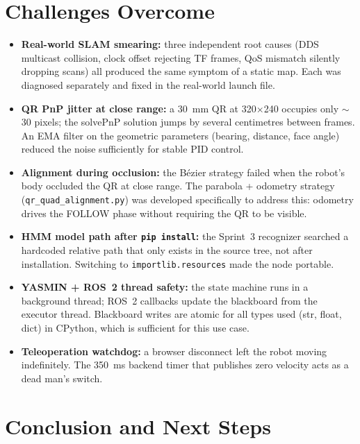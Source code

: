 \documentclass[conference]{IEEEtran}
\begin{document}
\section{Challenges Overcome}

\begin{itemize}[leftmargin=*]
  \item \textbf{Real-world SLAM smearing:} three independent root causes
        (DDS multicast collision, clock offset rejecting TF frames, QoS
        mismatch silently dropping scans) all produced the same symptom of a
        static map. Each was diagnosed separately and fixed in the real-world
        launch file.
  \item \textbf{QR PnP jitter at close range:} a 30~mm QR at 320$\times$240
        occupies only $\sim$30 pixels; the solvePnP solution jumps by several
        centimetres between frames. An EMA filter on the geometric parameters
        (bearing, distance, face angle) reduced the noise sufficiently for
        stable PID control.
  \item \textbf{Alignment during occlusion:} the Bézier strategy failed when
        the robot's body occluded the QR at close range. The parabola +
        odometry strategy (\texttt{qr\_quad\_alignment.py}) was developed
        specifically to address this: odometry drives the FOLLOW phase without
        requiring the QR to be visible.
  \item \textbf{HMM model path after \texttt{pip install}:} the Sprint~3
        recognizer searched a hardcoded relative path that only exists in the
        source tree, not after installation. Switching to
        \texttt{importlib.resources} made the node portable.
  \item \textbf{YASMIN + ROS~2 thread safety:} the state machine runs in a
        background thread; ROS~2 callbacks update the blackboard from the
        executor thread. Blackboard writes are atomic for all types used
        (str, float, dict) in CPython, which is sufficient for this use case.
  \item \textbf{Teleoperation watchdog:} a browser disconnect left the robot
        moving indefinitely. The 350~ms backend timer that publishes zero
        velocity acts as a dead man's switch.
\end{itemize}

\section{Conclusion and Next Steps}
\end{document}
